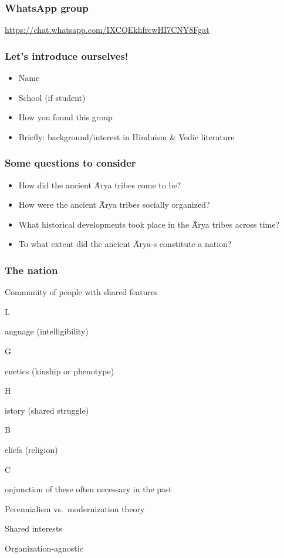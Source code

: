 \documentclass[pdf]{beamer}
\newcommand{\Subitem}[1]{{\setlength\itemindent{12pt} \item[-] #1}}
\begin{document}
\begin{frame} \frametitle{WhatsApp group}
\begin{center}
	\href{https://chat.whatsapp.com/IXCQEkhfrcwHI7CNY8Fgat}{https://chat.whatsapp.com/IXCQEkhfrcwHI7CNY8Fgat}
\end{center}
\end{frame}

\begin{frame} \frametitle{Let's introduce ourselves!}
\begin{itemize}
	\item Name
	\item School (if student)
	\item How you found this group
	\item Briefly: background/interest in Hinduism \& Vedic literature
\end{itemize}
\end{frame}

\begin{frame}[label=questions] \frametitle{Some questions to consider}
\begin{itemize}
	\item How did the ancient Ā́rya tribes come to be?
	\item How were the ancient Ā́rya tribes socially organized?
	\item What historical developments took place in the Ā́rya tribes across time?
	\item To what extent did the ancient Ā́rya-s constitute a nation?
\end{itemize}
\end{frame}

\begin{frame} \frametitle{The nation}
\begin{itemize}
	\item Community of people with shared features
	\Subitem Language (intelligibility)
	\Subitem Genetics (kinship or phenotype)
	\Subitem History (shared struggle)
	\Subitem Beliefs (religion)
	\Subitem Conjunction of these often necessary in the past
	\item Perennialism vs.~modernization theory
	\item Shared interests
	\item Organization-agnostic
\end{itemize}
\end{frame}
\end{document}
